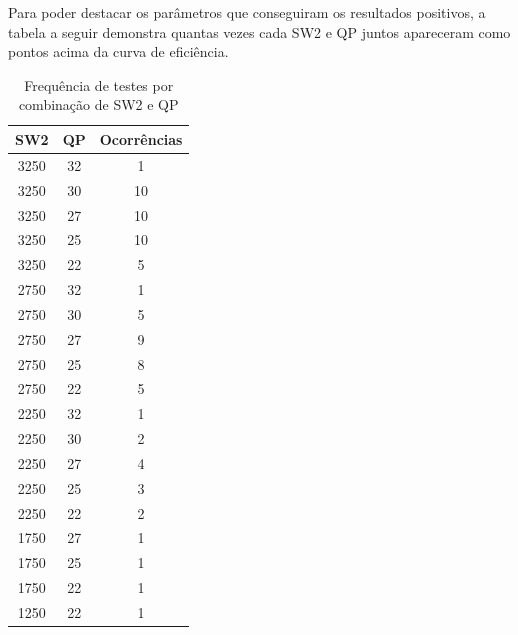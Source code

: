 Para poder destacar os parâmetros que conseguiram os resultados positivos, a tabela a seguir demonstra
quantas vezes cada SW2 e QP juntos apareceram como pontos acima da curva de eficiência.

\begin{table}[h]
    \centering
    \begin{tabular}{|c|c|c|}
        \hline
        \textbf{SW2} & \textbf{QP} & \textbf{Ocorrências} \\
        \hline
        3250 & 32 & 1 \\
        3250 & 30 & 10 \\
        3250 & 27 & 10 \\
        3250 & 25 & 10 \\
        3250 & 22 & 5 \\
        \hline
        2750 & 32 & 1 \\
        2750 & 30 & 5 \\
        2750 & 27 & 9 \\
        2750 & 25 & 8 \\
        2750 & 22 & 5 \\
        \hline
        2250 & 32 & 1 \\
        2250 & 30 & 2 \\
        2250 & 27 & 4 \\
        2250 & 25 & 3 \\
        2250 & 22 & 2 \\
        \hline
        1750 & 27 & 1 \\
        1750 & 25 & 1 \\
        1750 & 22 & 1 \\
        \hline
        1250 & 22 & 1 \\
        \hline
    \end{tabular}
    \caption{Frequência de testes por combinação de SW2 e QP}
    \label{tab:sw2_qp_freq}
\end{table}